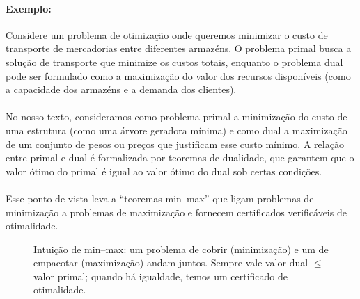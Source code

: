 \documentclass[12pt,a4paper]{article}
\def\\{}%
\def\emph#1{#1}%
\begin{document}
\paragraph{Exemplo:}
Considere um problema de otimização onde queremos minimizar o custo de transporte de mercadorias entre diferentes armazéns. O problema primal busca a solução de transporte que minimize os custos totais, enquanto o problema dual pode ser formulado como a maximização do valor dos recursos disponíveis (como a capacidade dos armazéns e a demanda dos clientes).

\paragraph{}
No nosso texto, consideramos como problema primal a minimização do custo de uma estrutura (como uma árvore geradora mínima) e como dual a maximização de um conjunto de pesos ou preços que justificam esse custo mínimo. A relação entre primal e dual é formalizada por teoremas de dualidade, que garantem que o valor ótimo do primal é igual ao valor ótimo do dual sob certas condições.

\paragraph{}
Esse ponto de vista leva a “teoremas min–max” que ligam problemas de \emph{minimização} a problemas de \emph{maximização} e fornecem certificados verificáveis de otimalidade.

\begin{figure}[H]
\centering
{}
\caption{Intuição de min--max: um problema de cobrir (minimização) e um de empacotar (maximização) andam juntos. Sempre vale valor dual $\le$ valor primal; quando há igualdade, temos um certificado de otimalidade.}
\label{fig:min-max-cert}
\end{figure}
\end{document}
